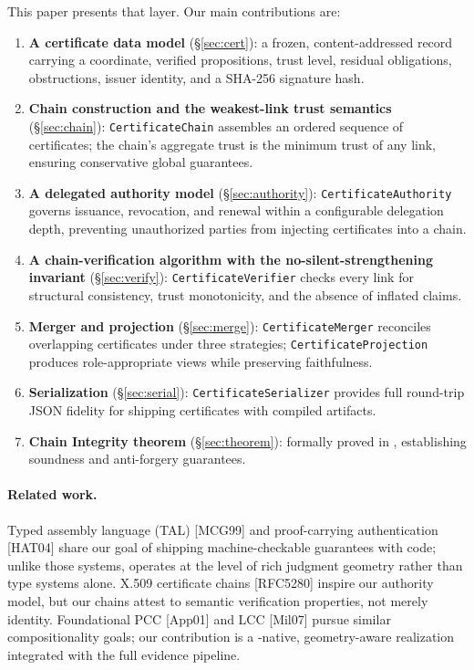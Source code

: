 \documentclass[11pt]{article}
\newcommand{\citeApp}{[App01]}
\newcommand{\citeTAL}{[MCG99]}
\newcommand{\citeLCC}{[Mil07]}
\newcommand{\citeXcert}{[RFC5280]}
\newcommand{\citeHAT}{[HAT04]}
\begin{document}
This paper presents that layer.
Our main contributions are:

\begin{enumerate}[leftmargin=2em]
  \item \textbf{A certificate data model} (\S\ref{sec:cert}): a frozen,
        content-addressed record carrying a coordinate, verified propositions,
        trust level, residual obligations, obstructions, issuer identity, and
        a SHA-256 signature hash.

  \item \textbf{Chain construction and the weakest-link trust semantics}
        (\S\ref{sec:chain}): \texttt{CertificateChain} assembles an ordered
        sequence of certificates; the chain's aggregate trust is the minimum
        trust of any link, ensuring conservative global guarantees.

  \item \textbf{A delegated authority model} (\S\ref{sec:authority}):
        \texttt{CertificateAuthority} governs issuance, revocation, and renewal
        within a configurable delegation depth, preventing unauthorized parties
        from injecting certificates into a chain.

  \item \textbf{A chain-verification algorithm with the no-silent-strengthening
        invariant} (\S\ref{sec:verify}): \texttt{CertificateVerifier} checks
        every link for structural consistency, trust monotonicity, and the
        absence of inflated claims.

  \item \textbf{Merger and projection} (\S\ref{sec:merge}): \texttt{CertificateMerger}
        reconciles overlapping certificates under three strategies;
        \texttt{CertificateProjection} produces role-appropriate views while
        preserving faithfulness.

  \item \textbf{Serialization} (\S\ref{sec:serial}):
        \texttt{CertificateSerializer} provides full round-trip JSON
        fidelity for shipping certificates with compiled artifacts.

  \item \textbf{Chain Integrity theorem} (\S\ref{sec:theorem}):
        formally proved in \LEAN{}, establishing soundness and
        anti-forgery guarantees.
\end{enumerate}

\paragraph{Related work.}
Typed assembly language (TAL) \citeTAL{} and proof-carrying
authentication \citeHAT{} share our goal of shipping machine-checkable
guarantees with code; unlike those systems, \JuGeo{} operates at the
level of rich judgment geometry rather than type systems alone.
X.509 certificate chains \citeXcert{} inspire our authority model, but
our chains attest to semantic verification properties, not merely identity.
Foundational PCC \citeApp{} and LCC \citeLCC{} pursue similar compositionality
goals; our contribution is a \Python{}-native, geometry-aware realization
integrated with the full \JuGeo{} evidence pipeline.
\end{document}
